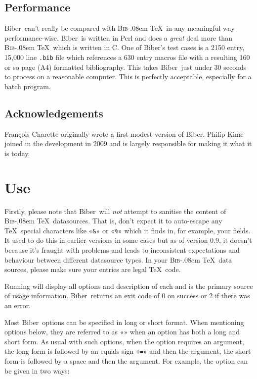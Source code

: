 \documentclass{ltxdockit}
\def\BibTeX{\textsc{Bib}\kern-.08em \TeX}
\newcommand*{\biber}{Biber\xspace}
\begin{document}
\subsection{Performance}

\biber\ can't really be compared with \BibTeX\ in any meaningful
way performance-wise. \biber\ is written in Perl and does a
\emph{great} deal more than \BibTeX\ which is written in C. One of
\biber's test cases is a 2150 entry, 15,000 line \verb+.bib+ file
which references a 630 entry macros file with a resulting 160 or so page (A4)
formatted bibliography. This takes \biber\ just under 30 seconds to process on
a reasonable computer. This is perfectly acceptable, especially for a
batch program.

\subsection{Acknowledgements}

François Charette originally wrote a first modest version of \biber. Philip Kime joined in
the development in 2009 and is largely responsible for making it what it is today. 

\section{Use}

Firstly, please note that \biber\ will \emph{not} attempt to sanitise
the content of \BibTeX\ datasources. That is, don't expect it to
auto-escape any \TeX\ special characters like «\verb+&+» or «\verb+%+» which
it finds in, for example, your  fields. It used to do this in
earlier versions in some cases but as of version 0.9, it doesn't because
it's fraught with problems and leads to inconsistent expectations and
behaviour between different datasource types. In your \BibTeX\ data
sources, please make sure your entries are legal \TeX\ code.

Running  will display all options and description of
each and is the primary source of usage information. \biber\
returns an exit code of 0 on success or 2 if there was an error.

Most \biber\ options can be specified in long or short format. When
mentioning options below, they are referred to as
«» when an option has both a long and short
form. As usual with such options, when the option requires an argument, the
long form is followed by an equals sign «\verb+=+» and then the argument,
the short form is followed by a space and then the argument. For example,
the \opt{--configfile|-g} option can be given in two ways:
\end{document}
